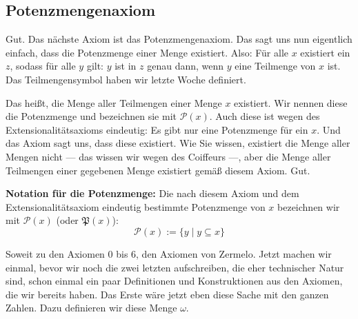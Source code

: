 \subsection{Potenzmengenaxiom}
\begin{spoken-clean}[00:41:37 - 00:43:31]
Gut. Das nächste Axiom ist das Potenzmengenaxiom. Das sagt uns nun eigentlich einfach, dass die Potenzmenge einer Menge existiert. Also: Für alle $x$ existiert ein $z$, sodass für alle $y$ gilt: $y$ ist in $z$ genau dann, wenn $y$ eine Teilmenge von $x$ ist. Das Teilmengensymbol haben wir letzte Woche definiert.

Das heißt, die Menge aller Teilmengen einer Menge $x$ existiert. Wir nennen diese die Potenzmenge und bezeichnen sie mit $\mathcal{P}(x)$. Auch diese ist wegen des Extensionalitätsaxioms eindeutig: Es gibt nur eine Potenzmenge für ein $x$. Und das Axiom sagt uns, dass diese existiert. Wie Sie wissen, existiert die Menge aller Mengen nicht --- das wissen wir wegen des Coiffeurs ---, aber die Menge aller Teilmengen einer gegebenen Menge existiert gemäß diesem Axiom. Gut.
\end{spoken-clean}

\begin{math-stroke}[Potenzmengenaxiom]
\begin{axioms}
\end{axioms}

\textbf{Notation für die Potenzmenge:}
Die nach diesem Axiom und dem Extensionalitätsaxiom eindeutig bestimmte Potenzmenge von $x$ bezeichnen wir mit $\mathcal{P}(x)$ (oder $\mathfrak{P}(x)$):
\[
\mathcal{P}(x) := \{ y \mid y \subseteq x \}
\]
\end{math-stroke}

\begin{spoken-clean}[00:43:31 - 00:45:01]
Soweit zu den Axiomen 0 bis 6, den Axiomen von Zermelo. Jetzt machen wir einmal, bevor wir noch die zwei letzten aufschreiben, die eher technischer Natur sind, schon einmal ein paar Definitionen und Konstruktionen aus den Axiomen, die wir bereits haben. Das Erste wäre jetzt eben diese Sache mit den ganzen Zahlen. Dazu definieren wir diese Menge $\omega$.
\end{spoken-clean}

